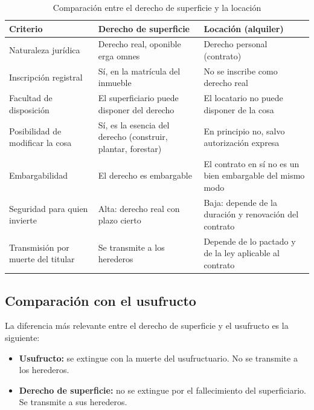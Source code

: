 \documentclass[12pt,oneside]{book}
\begin{document}
\vspace{0.5em}

\begin{table}[H]
\centering
\caption{Comparación entre el derecho de superficie y la locación}
\begin{tabularx}{\textwidth}{
    >{\raggedright\arraybackslash}p{}
    >{\raggedright\arraybackslash}X
    >{\raggedright\arraybackslash}X
}
\toprule
\textbf{Criterio} & \textbf{Derecho de superficie} & \textbf{Locación (alquiler)} \\
\midrule
Naturaleza jurídica & Derecho real, oponible erga omnes & Derecho personal (contrato) \\
\addlinespace
Inscripción registral & Sí, en la matrícula del inmueble & No se inscribe como derecho real \\
\addlinespace
Facultad de disposición & El superficiario puede disponer del derecho & El locatario no puede disponer de la cosa \\
\addlinespace
Posibilidad de modificar la cosa & Sí, es la esencia del derecho (construir, plantar, forestar) & En principio no, salvo autorización expresa \\
\addlinespace
Embargabilidad & El derecho es embargable & El contrato en sí no es un bien embargable del mismo modo \\
\addlinespace
Seguridad para quien invierte & Alta: derecho real con plazo cierto & Baja: depende de la duración y renovación del contrato \\
\addlinespace
Transmisión por muerte del titular & Se transmite a los herederos & Depende de lo pactado y de la ley aplicable al contrato \\
\bottomrule
\end{tabularx}
\end{table}

\subsection{Comparación con el usufructo}

La diferencia más relevante entre el derecho de superficie y el usufructo es la siguiente:

\begin{itemize}
    \item \textbf{Usufructo:} se extingue con la muerte del usufructuario. No se transmite a los herederos.
    \item \textbf{Derecho de superficie:} no se extingue por el fallecimiento del superficiario. Se transmite a sus herederos.
\end{itemize}
\end{document}
